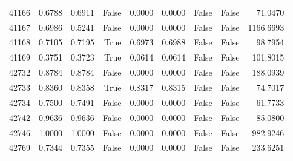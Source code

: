 \begin{longtable}{rrrrrrrrr}
41166 & 0.6788 & 0.6911 & False & 0.0000 & 0.0000 & False & False & 71.0470 \\
41167 & 0.6986 & 0.5241 & False & 0.0000 & 0.0000 & False & False & 1166.6693 \\
41168 & 0.7105 & 0.7195 & True & 0.6973 & 0.6988 & False & False & 98.7954 \\
41169 & 0.3751 & 0.3723 & True & 0.0614 & 0.0614 & False & False & 101.8015 \\
42732 & 0.8784 & 0.8784 & False & 0.0000 & 0.0000 & False & False & 188.0939 \\
42733 & 0.8360 & 0.8358 & True & 0.8317 & 0.8315 & False & False & 74.7017 \\
42734 & 0.7500 & 0.7491 & False & 0.0000 & 0.0000 & False & False & 61.7733 \\
42742 & 0.9636 & 0.9636 & False & 0.0000 & 0.0000 & False & False & 85.0800 \\
42746 & 1.0000 & 1.0000 & False & 0.0000 & 0.0000 & False & False & 982.9246 \\
42769 & 0.7344 & 0.7355 & False & 0.0000 & 0.0000 & False & False & 233.6251 \\
\end{longtable}
